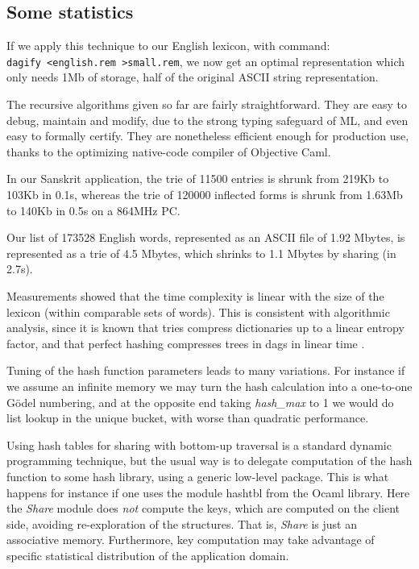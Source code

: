 \subsection{Some statistics}

\vspace*{15pt}

If we apply this technique to our English lexicon, with command:\\
\verb:dagify <english.rem >small.rem:, we now get an optimal
representation which only needs 1Mb of storage, half of the
original ASCII string representation.

The recursive algorithms given so far are fairly straightforward. 
They are easy to debug, maintain and modify,
due to the strong typing safeguard of ML, and even easy to formally certify. 
They are nonetheless efficient enough for production use, thanks to the
optimizing native-code compiler of Objective Caml. 

In our Sanskrit application, the trie of 11500 entries
is shrunk from 219Kb to 103Kb in 0.1s, whereas the trie of 120000 inflected
forms is shrunk from 1.63Mb to 140Kb in 0.5s on a 864MHz PC.

Our list of 173528 English words, represented as an ASCII file of 1.92
Mbytes, is represented as a trie of 4.5 Mbytes, which shrinks to 1.1
Mbytes by sharing (in 2.7s).

Measurements showed that the time complexity is linear with the size of
the lexicon (within comparable sets of words). This is consistent with
algorithmic analysis, since it is known that tries compress dictionaries
up to a linear entropy factor, and that perfect hashing compresses trees
in dags in linear time \cite{flajsipste}.

Tuning of the hash function parameters leads to many variations.
For instance if we assume an infinite memory we may turn the hash calculation
into a one-to-one G\"odel numbering, and at the opposite end taking
{\sl hash\_max} to 1 we would do list lookup in the unique bucket,
with worse than quadratic performance. 

Using hash tables for sharing with bottom-up traversal is a standard
dynamic programming technique, but the usual 
way is to delegate computation of the hash function to some hash library,
using a generic low-level package. This is what happens for instance
if one uses the module hashtbl from the Ocaml library. Here the 
{\sl Share} module does {\sl not} compute the keys, which are computed
on the client side, avoiding re-exploration of the structures. That is,
{\sl Share} is just an associative memory. Furthermore, key computation may 
take advantage of specific statistical distribution of the application domain.


